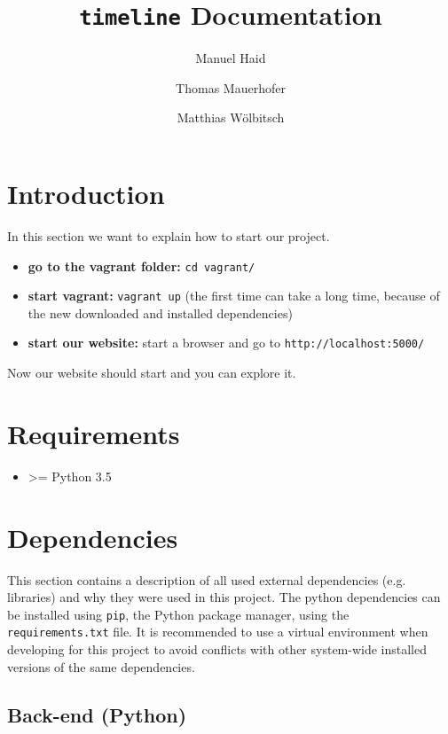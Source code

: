 \documentclass[11pt, a4paper]{article}
\author{Manuel Haid \and Thomas Mauerhofer \and Matthias Wölbitsch}
\title{\texttt{timeline} Documentation}
\begin{document}
\maketitle
\tableofcontents

\section{Introduction} \label{sec:intoduction}

In this section we want to explain how to start our project.

\begin{itemize}
\item
\textbf{go to the vagrant folder:} \texttt{cd vagrant/}
\item
\textbf{start vagrant:} \texttt{vagrant up} (the first time can take a long time, because of the new downloaded and installed dependencies)
\item
\textbf{start our website:} start a browser and go to \texttt{http://localhost:5000/}
\end{itemize}

Now our website should start and you can explore it.

\section{Requirements} \label{sec:requirments}

\begin{itemize}
 \item \textgreater= Python 3.5
\end{itemize}
 

\section{Dependencies}\label{sec:dependencies}

This section contains a description of all used external dependencies (e.g. libraries) and why they were used in this project.
The python dependencies can be installed using \texttt{pip}, the Python package manager, using the \texttt{requirements.txt} file. 
It is recommended to use a virtual environment when developing for this project to avoid conflicts with other system-wide installed versions of the same dependencies.


\subsection{Back-end (Python)}
\end{document}
